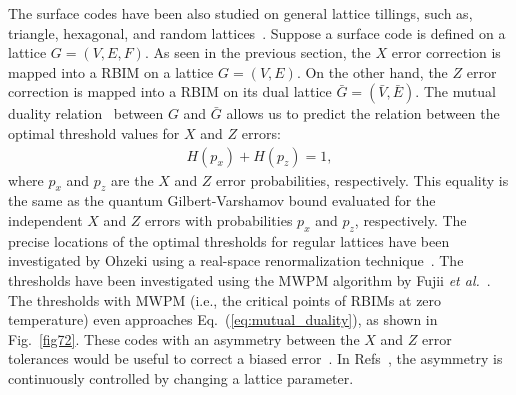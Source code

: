 The surface codes have been also studied on general lattice tillings, such as, triangle, hexagonal, and random lattices~\cite{Ohzeki09,Roth,FujiiTokunaga12,OhzekiFujii,Al-Shimary,Kay14}.
Suppose a surface code is defined on a lattice $G=(V,E,F)$.
As seen in the previous section, the $X$ error correction is mapped into a RBIM on a lattice $G=(V,E)$.
On the other hand, the $Z$ error correction is mapped into a RBIM on its dual lattice $\bar G=(\bar V, \bar E)$.
The mutual duality relation~\cite{NishimoriNemoto} between $G$ and $\bar G$ allows us to predict the relation between the optimal threshold values 
for $X$ and $Z$ errors:
\begin{eqnarray}
H(p_x)+H(p_z)=1,
\label{eq:mutual_duality}
\end{eqnarray}
where $p_x$ and $p_z$ are the $X$ and $Z$ error probabilities, respectively.
This equality is the same as the quantum Gilbert-Varshamov bound evaluated for the independent $X$ and $Z$ errors with probabilities $p_x$ and $p_z$, respectively.
The precise locations of the optimal thresholds for regular lattices have been investigated by Ohzeki using a real-space renormalization technique~\cite{Ohzeki09}.
The thresholds have been investigated using the MWPM algorithm by Fujii {\it et al.}~\cite{FujiiTokunaga12}.
The thresholds with MWPM (i.e., the critical points of RBIMs at zero temperature) even approaches Eq.\ (\ref{eq:mutual_duality}), as shown in Fig.~\ref{fig72}.
These codes with an asymmetry between the $X$ and $Z$ error tolerances would be useful to correct a biased error~\cite{BiasedNoiseNJP}.
In Refs~\cite{Roth,OhzekiFujii}, the asymmetry is continuously controlled by changing a lattice parameter.

